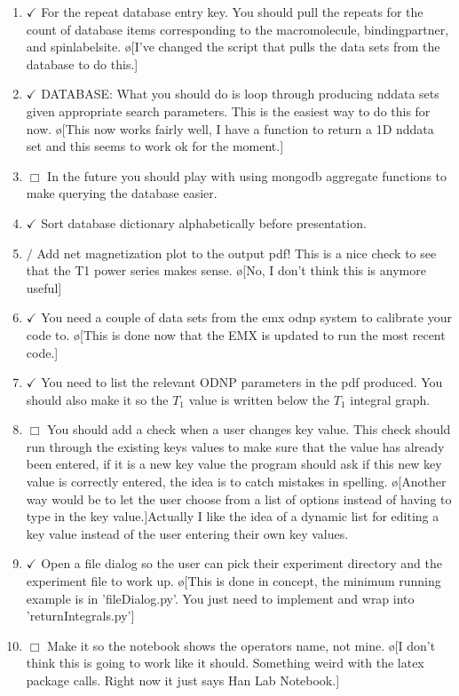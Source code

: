 \documentclass[10pt]{book}
\begin{document}
\begin{enumerate}
    \item $\checkmark$ For the repeat database entry key. You should pull the repeats for the count of database items corresponding to the macromolecule, bindingpartner, and spinlabelsite. \o[I've changed the script that pulls the data sets from the database to do this.]{}
    \item $\checkmark$ DATABASE: What you should do is loop through producing nddata sets given appropriate search parameters. This is the easiest way to do this for now. \o[This now works fairly well, I have a function to return a 1D nddata set and this seems to work ok for the moment.]{}
    \item $\Box$ In the future you should play with using mongodb aggregate functions to make querying the database easier.
    \item $\checkmark$ Sort database dictionary alphabetically before presentation.
    \item $/$ Add net magnetization plot to the output pdf! This is a nice check to see that the T1 power series makes sense. \o[No, I don't think this is anymore useful]{}
    \item $\checkmark$ You need a couple of data sets from the emx odnp system to calibrate your code to. \o[This is done now that the EMX is updated to run the most recent code.]{}
    \item $\checkmark$ You need to list the relevant ODNP parameters in the pdf produced. You should also make it so the $T_1$ value is written below the $T_1$ integral graph.
    \item $\Box$ You should add a check when a user changes key value. This check should run through the existing keys values to make sure that the value has already been entered, if it is a new key value the program should ask if this new key value is correctly entered, the idea is to catch mistakes in spelling. \o[Another way would be to let the user choose from a list of options instead of having to type in the key value.]{Actually I like the idea of a dynamic list for editing a key value instead of the user entering their own key values.}
    \item $\checkmark$ Open a file dialog so the user can pick their experiment directory and the experiment file to work up. \o[This is done in concept, the minimum running example is in 'fileDialog.py'. You just need to implement and wrap into 'returnIntegrals.py']{}
    \item $\Box$ Make it so the notebook shows the operators name, not mine. \o[I don't think this is going to work like it should. Something weird with the latex package calls. Right now it just says Han Lab Notebook.]{}

\end{enumerate}
\end{document}

